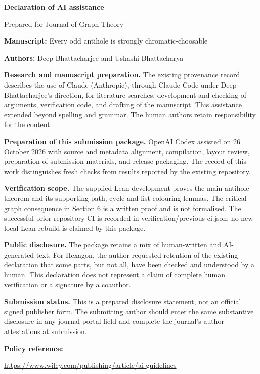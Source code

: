 \documentclass[11pt]{article}
\begin{document}
{\Large\bfseries Declaration of AI assistance}\par
Prepared for Journal of Graph Theory

\textbf{Manuscript:} Every odd antihole is strongly chromatic-choosable\par
\textbf{Authors:} Deep Bhattacharjee and Ushashi Bhattacharya

\textbf{Research and manuscript preparation.}
The existing provenance record describes the use of Claude (Anthropic), through Claude Code under Deep Bhattacharjee's direction, for literature searches, development and checking of arguments, verification code, and drafting of the manuscript. This assistance extended beyond spelling and grammar. The human authors retain responsibility for the content.

\textbf{Preparation of this submission package.}
OpenAI Codex assisted on 26 October 2026 with source and metadata alignment, compilation, layout review, preparation of submission materials, and release packaging. The record of this work distinguishes fresh checks from results reported by the existing repository.

\textbf{Verification scope.}
The supplied Lean development proves the main antihole theorem and its supporting path, cycle and list-colouring lemmas. The critical-graph consequence in Section 6 is a written proof and is not formalised. The successful prior repository CI is recorded in verification/previous-ci.json; no new local Lean rebuild is claimed by this package.

\textbf{Public disclosure.}
The package retains a mix of human-written and AI-generated text. For Hexagon, the author requested retention of the existing declaration that some parts, but not all, have been checked and understood by a human. This declaration does not represent a claim of complete human verification or a signature by a coauthor.

\textbf{Submission status.}
This is a prepared disclosure statement, not an official signed publisher form. The submitting author should enter the same substantive disclosure in any journal portal field and complete the journal's author attestations at submission.

\textbf{Policy reference:}\par
\url{https://www.wiley.com/publishing/article/ai-guidelines}
\end{document}
